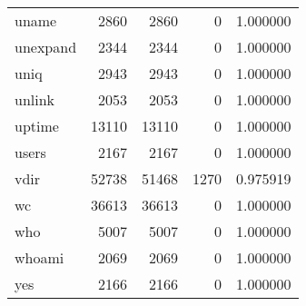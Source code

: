 \begin{tabular}{lrrrr}
uname     &                     2860 &         2860 &             0 &                 1.000000 \\
unexpand  &                     2344 &         2344 &             0 &                 1.000000 \\
uniq      &                     2943 &         2943 &             0 &                 1.000000 \\
unlink    &                     2053 &         2053 &             0 &                 1.000000 \\
uptime    &                    13110 &        13110 &             0 &                 1.000000 \\
users     &                     2167 &         2167 &             0 &                 1.000000 \\
vdir      &                    52738 &        51468 &          1270 &                 0.975919 \\
wc        &                    36613 &        36613 &             0 &                 1.000000 \\
who       &                     5007 &         5007 &             0 &                 1.000000 \\
whoami    &                     2069 &         2069 &             0 &                 1.000000 \\
yes       &                     2166 &         2166 &             0 &                 1.000000 \\
\bottomrule
\end{tabular}
